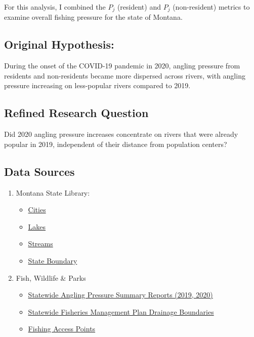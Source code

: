 \documentclass[11pt]{article}
\providecommand{\tightlist}{%
      \setlength{\itemsep}{0pt}\setlength{\parskip}{0pt}}
\begin{document}
For this analysis, I combined the \(P_j\) (resident) and \(P_j\)
(non-resident) metrics to examine overall fishing pressure for the state
of Montana.

    \hypertarget{original-hypothesis}{%
\subsection{Original Hypothesis:}\label{original-hypothesis}}

During the onset of the COVID-19 pandemic in 2020, angling pressure from
residents and non-residents became more dispersed across rivers, with
angling pressure increasing on less-popular rivers compared to 2019.

    \hypertarget{refined-research-question}{%
\subsection{Refined Research Question}\label{refined-research-question}}

Did 2020 angling pressure increases concentrate on rivers that were
already popular in 2019, independent of their distance from population
centers?

    \hypertarget{data-sources}{%
\subsection{Data Sources}\label{data-sources}}

\begin{enumerate}
\def\labelenumi{\arabic{enumi}.}
\tightlist
\item
  Montana State Library:

  \begin{itemize}
  \tightlist
  \item
    \href{https://msl.mt.gov/geoinfo/msdi/administrative_boundaries/}{Cities}
  \item
    \href{https://msl.mt.gov/geoinfo/water_information_system/nhd_high_resolution_data_download}{Lakes}
  \item
    \href{https://msl.mt.gov/geoinfo/water_information_system/nhd_high_resolution_data_download}{Streams}
  \item
    \href{https://msl.mt.gov/geoinfo/msdi/administrative_boundaries/}{State
    Boundary}
  \end{itemize}
\item
  Fish, Wildlife \& Parks

  \begin{itemize}
  \tightlist
  \item
    \href{https://fwp.mt.gov/fish/pressure-surveys}{Statewide Angling
    Pressure Summary Reports (2019, 2020)}
  \item
    \href{https://fwp-gis.mt.gov/arcgis/rest/services/fish/fishViewer/MapServer/66}{Statewide
    Fisheries Management Plan Drainage Boundaries}
  \item
    \href{https://gis-mtfwp.hub.arcgis.com/datasets/40c5d0eafa9343249239b71cbd4e95b6_0/explore?location=46.831007\%2C-109.511871\%2C6}{Fishing
    Access Points}
  \end{itemize}
\end{enumerate}
\end{document}
